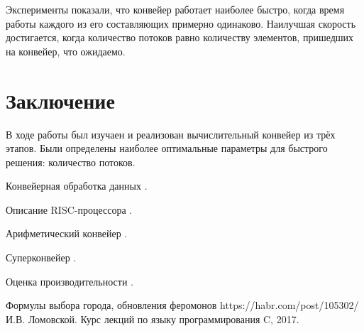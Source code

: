 \documentclass[a4paper, 14pt]{article}
\begin{document}
    \hspace{1cm} Эксперименты показали, что конвейер работает наиболее быстро, когда время работы каждого из его составляющих примерно одинаково. Наилучшая скорость достигается, когда количество потоков равно количеству элементов, пришедших на конвейер, что ожидаемо. 
	\newpage
	\section*{Заключение}
    
	\hspace{1cm}В ходе работы был изучаен и реализован вычислительный конвейер из трёх этапов. Были определены наиболее оптимальные параметры для быстрого решения: количество потоков.

    \newpage

    \begin{thebibliography}{11} 
    
     Конвейерная обработка данных .
    
     Описание RISC-процессора
    .
    
     Арифметический конвейер
    .
    
     Суперконвейер
    .
    
     Оценка производительности
    .
    
     Формулы выбора города, обновления феромонов https://habr.com/post/105302/
    И.В. Ломовской. Курс лекций по языку программирования C, 2017.
    
    \end{thebibliography}
\end{document}
